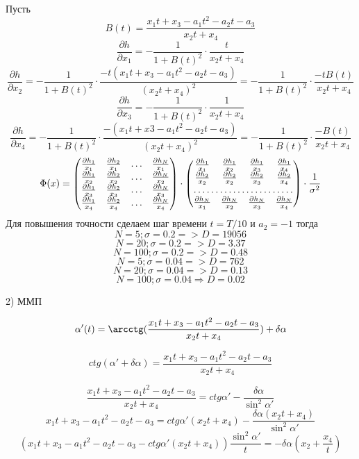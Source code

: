 \documentclass[a4paper,14pt]{article}
\theoremstyle{plain} %
\theoremstyle{definition} %
\theoremstyle{remark} %
\begin{document}
Пусть 
$$B(t)=\frac{x_1t+x_3-a_1t^2-a_2t-a_3}{x_2t+x_4}$$
$$
\frac{\partial h}{\partial x_1}=
-\frac{1}{1+B(t)^2}\cdot\frac{t}{x_2t+x_4}
$$
$$
\frac{\partial h}{\partial x_2}=
-\frac{1}{1+B(t)^2}\cdot\frac{-t(x_1t+x_3-a_1t^2-a_2t-a_3)}{(x_2t+x_4)^2}=-\frac{1}{1+B(t)^2}\cdot\frac{-tB(t)}{x_2t+x_4}
$$
$$
\frac{\partial h}{\partial x_3}=
-\frac{1}{1+B(t)^2}\cdot\frac{1}{x_2t+x_4}
$$
$$
\frac{\partial h}{\partial x_4}=
-\frac{1}{1+B(t)^2}\cdot\frac{-(x_1t+x3-a_1t^2-a_2t-a_3)}{(x_2t+x_4)^2}=-\frac{1}{1+B(t)^2}\cdot\frac{-B(t)}{x_2t+x_4}
$$
\[
\Phi(x)=
\begin{pmatrix}
    \frac{\partial h_1}{x_1} & \frac{\partial h_2}{x_1}  & \dots & \frac{\partial h_N}{x_1} \\
    \frac{\partial h_1}{x_2} & \frac{\partial h_2}{x_2}  & \dots & \frac{\partial h_N}{x_2} \\
    \frac{\partial h_1}{x_3} & \frac{\partial h_2}{x_3}  & \dots & \frac{\partial h_N}{x_3} \\
    \frac{\partial h_1}{x_4} & \frac{\partial h_2}{x_4}  & \dots & \frac{\partial h_N}{x_4} 
\end{pmatrix}
\cdot
\begin{pmatrix}
    \frac{\partial h_1}{x_1} & \frac{\partial h_1}{x_2}  & \frac{\partial h_1}{x_3} & \frac{\partial h_1}{x_4} \\
    \frac{\partial h_2}{x_2} & \frac{\partial h_2}{x_2}  & \frac{\partial h_2}{x_3} & \frac{\partial h_2}{x_4} \\
    \hdotsfor{4} \\
    \frac{\partial h_N}{x_1} & \frac{\partial h_N}{x_2}  & \frac{\partial h_N}{x_3} & \frac{\partial h_N}{x_4} 
\end{pmatrix}
\cdot \frac{1}{\sigma^2}
\]
Для повышения точности сделаем шаг времени $t=T/10$ и  $a_2=-1$ тогда
$$N=5;\sigma=0.2 =>D=19056$$
$$N=20;\sigma=0.2 =>D=3.37$$
$$N=100;\sigma=0.2 =>D=0.48$$
$$N=5;\sigma=0.04 =>D=762$$
$$N=20;\sigma=0.04 =>D=0.13$$
$$N=100;\sigma=0.04 \Rightarrow D=0.02$$

2) ММП

$$\alpha'(t)=\arcctg(\frac{x_1t+x_3-a_1t^2-a_2t-a_3}{x_2t+x_4})+\delta \alpha$$

$$ctg(\alpha'+\delta \alpha)=\frac{x_1t+x_3-a_1t^2-a_2t-a_3}{ x_2t+x_4}$$

$$
\frac{x_1t+x_3-a_1t^2-a_2t-a_3}{ x_2t+x_4}=ctg \alpha'-\frac{\delta \alpha}{\sin^2\alpha'}
$$
$$
x_1t+x_3-a_1t^2-a_2t-a_3=ctg \alpha'(x_2t+x_4)-\frac{\delta \alpha(x_2t+x_4)}{\sin^2\alpha'}
$$
$$
( x_1t+x_3-a_1t^2-a_2t-a_3-ctg\alpha'( x_2t+x_4))\frac{\sin^2\alpha'}{t}=-\delta \alpha(x_2+\frac{x_4}{t})
$$
\end{document}
